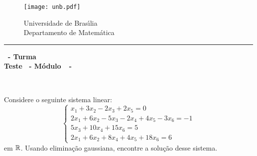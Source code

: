 \documentclass[12pt]{exam}
\begin{document}
    \begin{figure}[h]
        \begin{minipage}[c]{1.7cm}
            \texttt{[image: unb.pdf]}
        \end{minipage}
        \hspace{0pt}
        \begin{minipage}[c]{4in}
            {Universidade de Bras{\'\i}lia} \\
            {Departamento de Matem{\'a}tica}
        \end{minipage}
    \end{figure}
    \hrule
    \begin{center}
        {\Large\bf \disciplina\ - Turma \turma}  \\
         {\large\bf Teste \numeroteste\ - Módulo\ \modulo\ -\ \dataavaliacao}
    \end{center}

    \\
    \vspace*{.01cm}

    \vspace{.4cm}

    \questao{} Considere o seguinte sistema linear:
    \[
        \begin{cases}
            x_1 + 3x_2 - 2x_3 + 2x_5 = 0\\
            2x_1 + 6x_2 - 5x_3 - 2x_4 + 4x_5 - 3x_6 = -1\\
            5x_3 + 10x_4 + 15x_6 = 5\\
            2x_1 + 6x_2 + 8x_4 + 4x_5 + 18x_6 = 6
        \end{cases}
    \]
em $\mathbb{R}$. Usando eliminação gaussiana, encontre a solução desse sistema.
\end{document}
